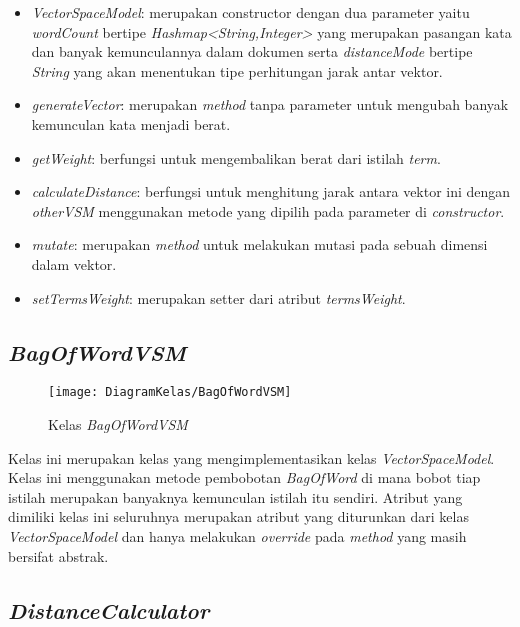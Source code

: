 \begin{itemize}
	\item \textit{VectorSpaceModel}: merupakan constructor dengan dua parameter yaitu \textit{wordCount} bertipe \textit{Hashmap<String,Integer>} yang merupakan pasangan kata dan banyak kemunculannya dalam dokumen serta \textit{distanceMode} bertipe \textit{String} yang akan menentukan tipe perhitungan jarak antar vektor.
	\item \textit{generateVector}: merupakan \textit{method} tanpa parameter untuk mengubah banyak kemunculan kata menjadi berat.
	\item \textit{getWeight}: berfungsi untuk mengembalikan berat dari istilah \textit{term}.
	\item \textit{calculateDistance}: berfungsi untuk menghitung jarak antara vektor ini dengan \textit{otherVSM} menggunakan metode yang dipilih pada parameter di \textit{constructor}.
	\item \textit{mutate}: merupakan \textit{method} untuk melakukan mutasi pada sebuah dimensi dalam vektor.
	\item \textit{setTermsWeight}: merupakan setter dari atribut \textit{termsWeight}.
\end{itemize}

\subsection{\textit{BagOfWordVSM}}

\begin{figure}[h]
	\begin{center}
		\texttt{[image: DiagramKelas/BagOfWordVSM]}
		\caption{Kelas \textit{BagOfWordVSM}}
		\label{fig:kelasBagOfWordVSM}
	\end{center}
\end{figure}

Kelas ini merupakan kelas yang mengimplementasikan kelas \textit{VectorSpaceModel}. Kelas ini menggunakan metode pembobotan \textit{BagOfWord} di mana bobot tiap istilah merupakan banyaknya kemunculan istilah itu sendiri. Atribut yang dimiliki kelas ini seluruhnya merupakan atribut yang diturunkan dari kelas \textit{VectorSpaceModel} dan hanya melakukan \textit{override} pada \textit{method} yang masih bersifat abstrak.

\subsection{\textit{DistanceCalculator}}

